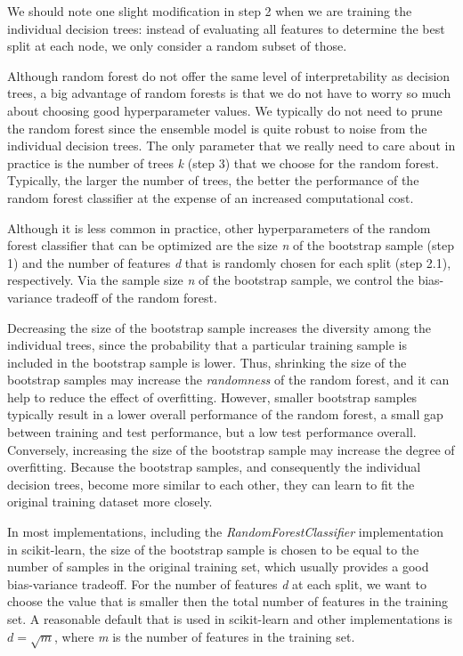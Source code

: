 \documentclass[11pt]{article}
\begin{document}
We should note one slight modification in step 2 when we are training
the individual decision trees: instead of evaluating all features to
determine the best split at each node, we only consider a random subset
of those.

    Although random forest do not offer the same level of interpretability
as decision trees, a big advantage of random forests is that we do not
have to worry so much about choosing good hyperparameter values. We
typically do not need to prune the random forest since the ensemble
model is quite robust to noise from the individual decision trees. The
only parameter that we really need to care about in practice is the
number of trees \emph{k} (step 3) that we choose for the random forest.
Typically, the larger the number of trees, the better the performance of
the random forest classifier at the expense of an increased
computational cost.

Although it is less common in practice, other hyperparameters of the
random forest classifier that can be optimized are the size \emph{n} of
the bootstrap sample (step 1) and the number of features \emph{d} that
is randomly chosen for each split (step 2.1), respectively. Via the
sample size \emph{n} of the bootstrap sample, we control the
bias-variance tradeoff of the random forest.

Decreasing the size of the bootstrap sample increases the diversity
among the individual trees, since the probability that a particular
training sample is included in the bootstrap sample is lower. Thus,
shrinking the size of the bootstrap samples may increase the
\emph{randomness} of the random forest, and it can help to reduce the
effect of overfitting. However, smaller bootstrap samples typically
result in a lower overall performance of the random forest, a small gap
between training and test performance, but a low test performance
overall. Conversely, increasing the size of the bootstrap sample may
increase the degree of overfitting. Because the bootstrap samples, and
consequently the individual decision trees, become more similar to each
other, they can learn to fit the original training dataset more closely.

In most implementations, including the \emph{RandomForestClassifier}
implementation in scikit-learn, the size of the bootstrap sample is
chosen to be equal to the number of samples in the original training
set, which usually provides a good bias-variance tradeoff. For the
number of features \emph{d} at each split, we want to choose the value
that is smaller then the total number of features in the training set. A
reasonable default that is used in scikit-learn and other
implementations is \(d = \sqrt{m}\), where \emph{m} is the number of
features in the training set.
\end{document}

